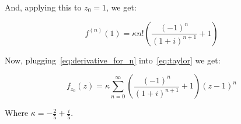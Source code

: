 And, applying this to $z_0 = 1$, we get:

\begin{equation}\label{eq:derivative_for_n}
    f^{(n)}(1) =  \kappa n! \left(\frac{(-1)^{n}}{(1+i)^{n+1}} + 1\right)
\end{equation}

Now, plugging~\eqref{eq:derivative_for_n} into~\eqref{eq:taylor} we get:

\begin{equation}\label{eq:taylor_series}
	f_{z_0}(z) = \kappa \sum_{n=0}^{\infty}
	\left(\frac{(-1)^{n}}{(1+i)^{n+1}} + 1\right) (z-1)^n
\end{equation}

Where $\kappa = -\frac{2}{5} + \frac{i}{5}$.

